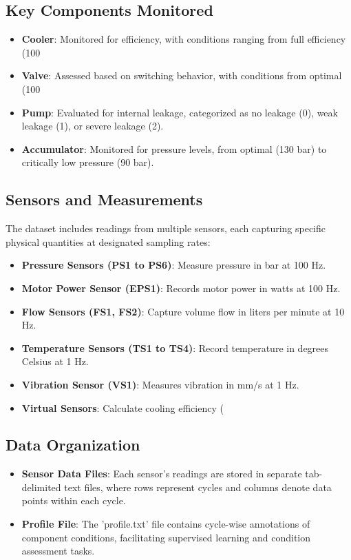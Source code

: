 \documentclass[sigconf]{acmart}
\begin{document}
\subsection{Key Components Monitored} 
\begin{itemize} 
    \item \textbf{Cooler}: Monitored for efficiency, with conditions ranging from full efficiency (100%
    \item \textbf{Valve}: Assessed based on switching behavior, with conditions from optimal (100%
    \item \textbf{Pump}: Evaluated for internal leakage, categorized as no leakage (0), weak leakage (1), or severe leakage (2).
    \item \textbf{Accumulator}: Monitored for pressure levels, from optimal (130 bar) to critically low pressure (90 bar).
\end{itemize}

\subsection{Sensors and Measurements} 
The dataset includes readings from multiple sensors, each capturing specific physical quantities at designated sampling rates:
\begin{itemize} 
    \item \textbf{Pressure Sensors (PS1 to PS6)}: Measure pressure in bar at 100 Hz.
    \item \textbf{Motor Power Sensor (EPS1)}: Records motor power in watts at 100 Hz.
    \item \textbf{Flow Sensors (FS1, FS2)}: Capture volume flow in liters per minute at 10 Hz.
    \item \textbf{Temperature Sensors (TS1 to TS4)}: Record temperature in degrees Celsius at 1 Hz.
    \item \textbf{Vibration Sensor (VS1)}: Measures vibration in mm/s at 1 Hz.
    \item \textbf{Virtual Sensors}: Calculate cooling efficiency (%
\end{itemize}

\subsection{Data Organization} 
\begin{itemize} 
    \item \textbf{Sensor Data Files}: Each sensor's readings are stored in separate tab-delimited text files, where rows represent cycles and columns denote data points within each cycle.
    \item \textbf{Profile File}: The 'profile.txt' file contains cycle-wise annotations of component conditions, facilitating supervised learning and condition assessment tasks.
\end{itemize}
\end{document}
